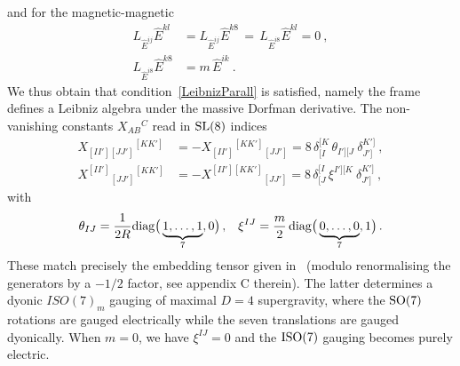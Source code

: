 \documentclass[debug]{phd}
\begin{document}
					and for the magnetic-magnetic
							\begin{equation}
								\begin{split}
									L_{\hat{E}^{ij}}\hat{E}^{kl} &= L_{\hat{E}^{ij}}\hat{E}^{k8} \, =\, L_{\hat{E}^{i8}}\hat{E}^{kl} = 0 \ ,\\
									L_{\hat{E}^{i8}}\hat{E}^{k8} &= m\, \hat{E}^{ik}\ .
								\end{split}
							\end{equation}
					We thus obtain that condition~\eqref{LeibnizParall} is satisfied, namely the frame defines a Leibniz algebra under the massive Dorfman derivative. 
					The non-vanishing constants $X_{AB}{}^C$ read in $\mathrm{SL}(8)$ indices
							\begin{equation}\label{ISO7m_emb_tens}
								\begin{split}
									X_{[II'][JJ']}{}^{[KK']} 		&= - X_{[II']}{}^{[KK']}{}_{[JJ']} = 8 \, \delta_{[I}^{[K} \, \theta_{I'][J} \ \delta_{J']}^{K']}\ , \\[2mm]
									X^{[II']}{}_{[JJ']}{}^{[KK']} 	&= - X^{[II'][KK']}{}_{[JJ']} = 8\, \delta^{[I}_{[J} \, \xi^{I'][K} \ \delta^{K']}_{J']}\ ,
								\end{split}
							\end{equation}
					with
							\begin{align}
								& &\theta_{IJ} = \frac{1}{2R} \mathrm{diag}\big(\underbrace{1,\ldots,1}_{7},0\big)\, ,& & \xi^{IJ} = \frac{m}{2} \,{\rm diag}\big(\underbrace{0,\ldots,0}_{7},1\big)\, . & & 
							\end{align}
					These match precisely the embedding tensor given in~\cite{Guarino:2015qaa} (modulo renormalising the generators by a $-1/2$ factor, see appendix C therein). 
					The latter determines a dyonic $ISO(7)_m$ gauging of maximal $D=4$ supergravity, where the $\mathrm{SO}(7)$ rotations are gauged electrically while the seven translations are gauged dyonically. 
					When $m=0$, we have $\xi^{IJ} =0$ and the $\mathrm{ISO}(7)$ gauging becomes purely electric.
					
\end{document}
